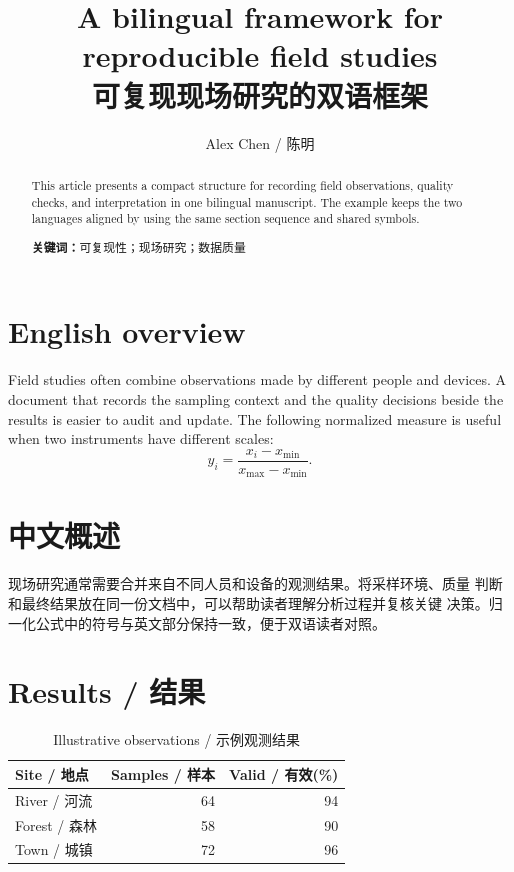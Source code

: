 \documentclass[12pt,a4paper,twoside]{ctexart}
\title{A bilingual framework for reproducible field studies\\
\zihao{-3}可复现现场研究的双语框架}
\author{Alex Chen / 陈明}
\date{}
\begin{document}
\maketitle

\begin{abstract}
This article presents a compact structure for recording field observations,
quality checks, and interpretation in one bilingual manuscript. The example
keeps the two languages aligned by using the same section sequence and shared
symbols.

\textbf{关键词：}可复现性；现场研究；数据质量
\end{abstract}

\section{English overview}
Field studies often combine observations made by different people and devices.
A document that records the sampling context and the quality decisions beside
the results is easier to audit and update. The following normalized measure is
useful when two instruments have different scales:
\begin{equation}
  y_i = \frac{x_i-x_{\min}}{x_{\max}-x_{\min}}.
\end{equation}

\section{中文概述}
现场研究通常需要合并来自不同人员和设备的观测结果。将采样环境、质量
判断和最终结果放在同一份文档中，可以帮助读者理解分析过程并复核关键
决策。归一化公式中的符号与英文部分保持一致，便于双语读者对照。

\section{Results / 结果}
\begin{table}[ht]
\centering
\caption{Illustrative observations / 示例观测结果}
\begin{tabular}{lrr}
\toprule
Site / 地点 & Samples / 样本 & Valid / 有效(\%)\\
\midrule
River / 河流 & 64 & 94\\
Forest / 森林 & 58 & 90\\
Town / 城镇 & 72 & 96\\
\bottomrule
\end{tabular}
\end{table}
\end{document}
